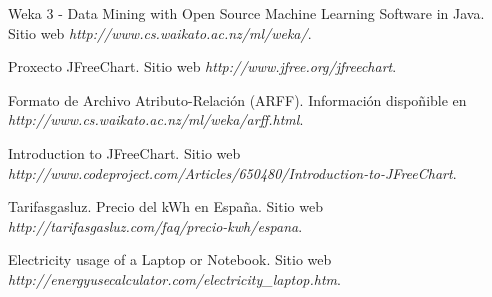 

\begin{thebibliography}{99}

 Weka 3 - Data Mining with Open Source Machine Learning Software in Java. Sitio web {\it http://www.cs.waikato.ac.nz/ml/weka/}.

 Proxecto JFreeChart. Sitio web {\it http://www.jfree.org/jfreechart}.

 Formato de Archivo Atributo-Relación (ARFF). Información dispoñible en {\it http://www.cs.waikato.ac.nz/ml/weka/arff.html}.

 Introduction to JFreeChart. Sitio web {\it http://www.codeproject.com/Articles/650480/Introduction-to-JFreeChart}.

 Tarifasgasluz. Precio del kWh en España. Sitio web {\it http://tarifasgasluz.com/faq/precio-kwh/espana}.

 Electricity usage of a Laptop or Notebook. Sitio web {\it http://energyusecalculator.com/electricity\_laptop.htm}.

\end{thebibliography}

